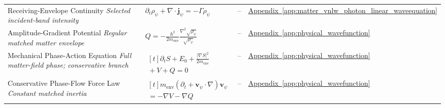 \begin{longtable}{@{} p{4.5cm} p{6cm} c p{4cm} @{}}
{\raggedright Receiving-Envelope Continuity \newline \textit{Selected incident-band intensity}\par} & {\raggedright $\partial_t\rho_\psi+\nabla\!\cdot\mathbf j_\psi=-\Gamma\rho_\psi$\par} & -- & {\raggedright \hyperref[app:matter_vnlw_photon_linear_waveequation]{Appendix~\ref*{app:matter_vnlw_photon_linear_waveequation}}\par} \\

{\raggedright Amplitude-Gradient Potential \newline \textit{Regular matched matter envelope}\par} & {\raggedright $Q=-\frac{\hbar^2}{2m_{\mathrm{env}}}\frac{\nabla^2\sqrt{\rho_\psi}}{\sqrt{\rho_\psi}}$\par} & -- & {\raggedright \hyperref[app:physical_wavefunction]{Appendix~\ref*{app:physical_wavefunction}}\par} \\

{\raggedright Mechanical Phase-Action Equation \newline \textit{Full matter-field phase; conservative branch}\par} & {\raggedright $\begin{gathered}[t]\partial_tS+E_0+\frac{|\nabla S|^2}{2m_{\mathrm{env}}} \\ {}+V+Q=0\end{gathered}$\par} & -- & {\raggedright \hyperref[app:physical_wavefunction]{Appendix~\ref*{app:physical_wavefunction}}\par} \\

{\raggedright Conservative Phase-Flow Force Law \newline \textit{Constant matched inertia}\par} & {\raggedright $\begin{gathered}[t]m_{\mathrm{env}}(\partial_t+\mathbf v_\psi\!\cdot\nabla)\mathbf v_\psi \\ =-\nabla V-\nabla Q\end{gathered}$\par} & -- & {\raggedright \hyperref[app:physical_wavefunction]{Appendix~\ref*{app:physical_wavefunction}}\par} \\


\end{longtable}
